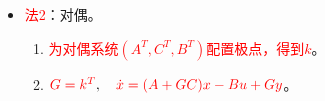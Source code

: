 \documentclass[
12pt, %
a4paper, 
oneside, %
]{scrartcl}
\begin{document}
\begin{itemize}
\begin{enumerate}
\begin{enumerate}
\item $ \hat{g}^T = g^T T^{-1}, \quad G^T = \hat{G} + \begin{bmatrix} \hat{g} & 0 \end{bmatrix} $。
\end{enumerate}
\end{enumerate}
\item \textcolor{red}{法2}：对偶。
\begin{enumerate}
\item \textcolor{red}{为对偶系统$ (A^T, C^T, B^T) $配置极点，得到$ k $}。
\item $ \textcolor{red}{G = k^T}, \quad \textcolor{red}{\dot{x} = (A + G C)x - B u + G y} $。
\end{enumerate}
\end{itemize}
\end{document}

